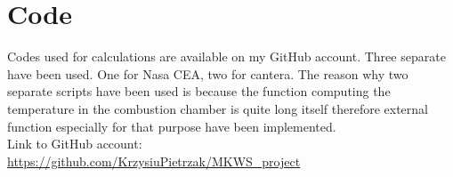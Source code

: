 \documentclass[11pt]{article}
\begin{document}
\section{Code}
Codes used for calculations are available on my GitHub account. Three separate have been used. One for Nasa CEA, two for cantera. The reason why two separate scripts have been used is because the function computing the temperature in the combustion chamber is quite long itself therefore external function especially for that purpose have been implemented.\\
Link to GitHub account:\\ 
\url{https://github.com/KrzysiuPietrzak/MKWS_project}
\end{document}

